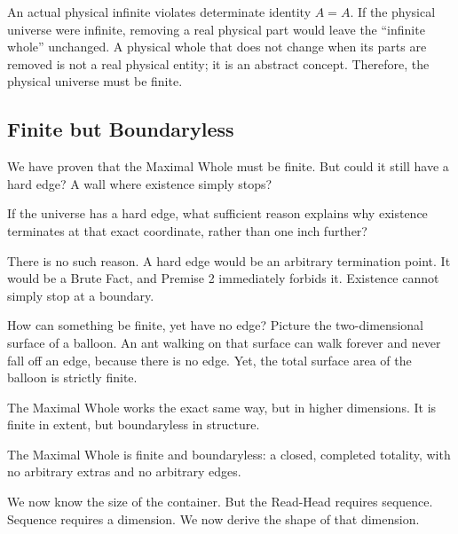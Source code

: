 \documentclass[11pt]{article}
\theoremstyle{canonstyle}
\begin{document}
\begin{keyresult}
An actual physical infinite violates determinate identity $A=A$. If the physical universe were infinite, removing a real physical part would leave the ``infinite whole'' unchanged. A physical whole that does not change when its parts are removed is not a real physical entity; it is an abstract concept. Therefore, the physical universe must be finite.
\end{keyresult}

\subsection{Finite but Boundaryless}

We have proven that the Maximal Whole must be finite. But could it still have a hard edge? A wall where existence simply stops?

\begin{reflect}
If the universe has a hard edge, what sufficient reason explains why existence terminates at that exact coordinate, rather than one inch further?
\end{reflect}

There is no such reason. A hard edge would be an arbitrary termination point. It would be a Brute Fact, and Premise 2 immediately forbids it. Existence cannot simply stop at a boundary.

How can something be finite, yet have no edge? Picture the two-dimensional surface of a balloon. An ant walking on that surface can walk forever and never fall off an edge, because there is no edge. Yet, the total surface area of the balloon is strictly finite. 

The Maximal Whole works the exact same way, but in higher dimensions. It is finite in extent, but boundaryless in structure. 

\begin{keyresult}
The Maximal Whole is finite and boundaryless: a closed, completed totality, with no arbitrary extras and no arbitrary edges.
\end{keyresult}

We now know the size of the container. But the Read-Head requires sequence. Sequence requires a dimension. We now derive the shape of that dimension.

\newpage
\end{document}
